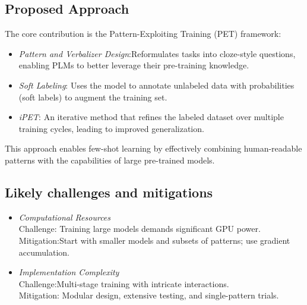 \documentclass[11pt,a4paper]{article}
\begin{document}
            \subsection{Proposed Approach} 
            The core contribution is the Pattern-Exploiting Training (PET) framework: 
            \begin{itemize}[topsep=0pt]
              \setlength\itemsep{0em}
              \item \textit{Pattern and Verbalizer Design}:Reformulates tasks into cloze-style questions, enabling PLMs to better leverage their pre-training knowledge. 
              \item \textit{Soft Labeling}: Uses the model to annotate unlabeled data with probabilities (soft labels) to augment the training set.
              \item \textit{iPET}: An iterative method that refines the labeled dataset over multiple training cycles, leading to improved generalization. 
            \end{itemize}
            This approach enables few-shot learning by effectively combining human-readable patterns with the capabilities of large pre-trained models. 
            \subsection{Likely challenges and mitigations}
            \begin{itemize}
              \item \textit{Computational Resources}\\Challenge: Training large models demands significant GPU power.
              \\Mitigation:Start with smaller models and subsets of patterns; use gradient accumulation.
              \item \textit{Implementation Complexity}\\Challenge:Multi-stage training with intricate interactions.\\
              Mitigation: Modular design, extensive testing, and single-pattern trials.
            \end{itemize}
\end{document}
